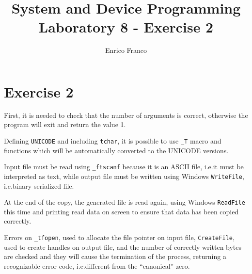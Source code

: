 \documentclass{report}
\author{Enrico Franco}
\title{System and Device Programming \\
	Laboratory 8 - Exercise 2}
\begin{document}
\section*{Exercise 2}

First, it is needed to check that the number of arguments is correct, otherwise
the program will exit and return the value 1.

Defining \texttt{UNICODE} and including \texttt{tchar}, it is possible to use \texttt{\_T} macro and functions which will be automatically converted to the UNICODE versions.

Input file must be read using \texttt{\_ftscanf} because it is an ASCII file, i.e.\@ it must be interpreted as text, while output file must be written using Windows \texttt{WriteFile}, i.e.\@ binary serialized file.

At the end of the copy, the generated file is read again, using Windows \texttt{ReadFile} this time and printing read data on screen to ensure that data has been copied correctly.

Errors on \texttt{\_tfopen}, used to allocate the file pointer on input file, \texttt{CreateFile}, used to create handles on output file, and the number of correctly written bytes are checked and they will cause the termination of the process, returning a recognizable error code, i.e.\@ different from the ``canonical'' zero.
\end{document}
